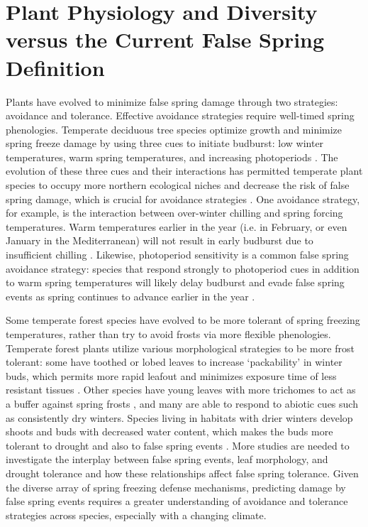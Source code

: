 \documentclass{article}\usepackage[]{graphicx}\usepackage[]{color}
\begin{document}
\section {Plant Physiology and Diversity versus the Current False Spring Definition}
Plants have evolved to minimize false spring damage through two strategies: avoidance and tolerance. Effective avoidance strategies require well-timed spring phenologies. Temperate deciduous tree species optimize growth and minimize spring freeze damage by using three cues to initiate budburst: low winter temperatures, warm spring temperatures, and increasing photoperiods \citep{Chuine2010}. The evolution of these three cues and their interactions has permitted temperate plant species to occupy more northern ecological niches and decrease the risk of false spring damage, which is crucial for avoidance strategies \citep{Samish1954}. One avoidance strategy, for example, is the interaction between over-winter chilling and spring forcing temperatures. Warm temperatures earlier in the year (i.e. in February, or even January in the Mediterranean) will not result in early budburst due to insufficient chilling \citep{Basler2012}. Likewise, photoperiod sensitivity is a common false spring avoidance strategy: species that respond strongly to photoperiod cues in addition to warm spring temperatures will likely delay budburst and evade false spring events as spring continues to advance earlier in the year \citep{Basler2014}. 

Some temperate forest species have evolved to be more tolerant of spring freezing temperatures, rather than try to avoid frosts via more flexible phenologies. Temperate forest plants utilize various morphological strategies to be more frost tolerant: some have toothed or lobed leaves to increase `packability' in winter buds, which permits more rapid leafout and minimizes exposure time of less resistant tissues \citep{Edwards2017}. Other species have young leaves with more trichomes to act as a buffer against spring frosts \citep{Agrawal2004, Prozherina2003}, and many are able to respond to abiotic cues such as consistently dry winters. Species living in habitats with drier winters develop shoots and buds with decreased water content, which makes the buds more tolerant to drought and also to false spring events \citep{Beck2007, Morin2007, Nielsen2009, Poirier2010, Kathke2011, Hofmann2015}. More studies are needed to investigate the interplay between false spring events, leaf morphology, and drought tolerance and how these relationships affect false spring tolerance. Given the diverse array of spring freezing defense mechanisms, predicting damage by false spring events requires a greater understanding of avoidance and tolerance strategies across species, especially with a changing climate.
\end{document}
